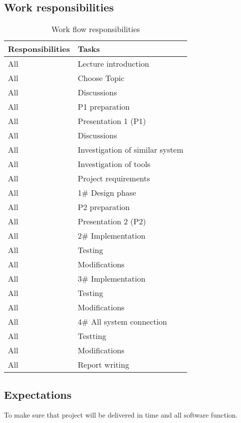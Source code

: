\newpage
\subsection{Work responsibilities}


\begin{table}[h]
	\centering
    \begin{tabular}{ | p{3cm} | p{5cm} |}
    \hline
    \textbf{Responsibilities} &  \textbf{Tasks} \\ \hline
    All & Lecture introduction\\ \hline
    All & Choose Topic\\ \hline
    All & Discussions\\ \hline
    All & P1 preparation\\ \hline
    All & Presentation 1 (P1)\\ \hline
    All & Discussions\\ \hline
    All & Investigation of similar system\\ \hline
    All & Investigation of tools\\ \hline
    All & Project requirements\\ \hline
    All & 1\# Design phase\\ \hline
    All & P2 preparation\\ \hline
    All & Presentation 2 (P2)\\ \hline
    All & 2\# Implementation\\ \hline
    All & Testing\\ \hline
    All & Modifications\\ \hline
    All & 3\# Implementation\\ \hline
    All & Testing\\ \hline
    All & Modifications\\ \hline
    All & 4\# All system connection\\ \hline
    All & Testting\\ \hline
    All & Modifications\\ \hline
    All & Report writing\\ \hline
 		\end{tabular}
 		\caption{Work flow responsibilities}
	\label{tab:WorkFlow}
\end{table}


\subsection{Expectations}

To make sure that project will be delivered in time and all software function.
